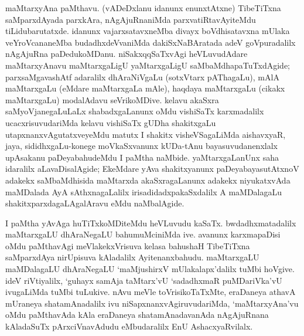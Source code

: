 maMtarxyAna paMthavu. (vADeDxlanu idanunx  enunxtAtxne) Tibe\-TiTxna saMparxdAyada parxkAra, nAgAjuRnaniMda parxvatiRtavAyiteMdu tiLidubarutatxde. idanunx vajarxsatavxneMba divayx boVdhisatavxna mUlaka veYroVcananeMba budadhxdeVvaniMda dakiSxNaBAratada adeV goVpuradalilx nAgAjuRna paDedukoMDanu. niSakxqqSaTxvAgi heVLuvudAdare maMtarxyAnavu maMtarxgaLigU yaMtarxgaLigU saMbaMdhapaTuTxdAgide; parxsaMgavashAtf adaralilx dhAraNiVgaLu (sotxVtarx pAThagaLu), mAlA maMtarxgaLu (eMdare maMtarxgaLa mAle), haqdaya maMtarxgaLu (cikakx maMtarxgaLu) modalAdavu seVrikoMDive. kelavu akaSxra saMyoVjanegaLuLaLx shabadxgaLanunx oMdu vishiSaTx karxmadalilx ucacxrisuvudariMda kelavu vishiSaTx gUDha shakitxgaLu utapxnanxvAgutatxveyeMdu matutx I shakitx visheVSagaLiMda aishavxyaR, jaya, sididhxgaLu-konege moVkaSxvanunx kUDa-tAnu bayasuvudanenxlalx upAsakanu paDeyabahudeMdu I paMtha naMbide. yaMtarxgaLanUnx saha idaralilx aLavaDisalAgide; EkeMdare yAva shakitxyanunx paDeyabayasutAtxnoV adakekx saMbaMdhisida maMtarxda akaSxragaLanunx adakekx niyukatxvAda maMDalada AyA sAthxnagaLalilx irisadidadxpakaSxdalilx A maMDalagaLu shakitxparxdagaLAgalAravu eMdu naMbalAgide.

I paMtha yAvAga huTiTxkoMDiteMdu heVLuvudu kaSaTx. bwdadhxmatadalilx maMtarx\-gaLU dhAraNegaLU bahumuMciniMda ive. avanunx karxmapaDisi oMdu paMthavAgi meVlakekxVrisuva kelasa bahushaH TibeTiTxna saMparxdAya nirUpisuva kAladalilx Ayitenanxbahudu. maMtarxgaLU maMDalagaLU dhAraNegaLU `maMjushirxV mUlakalapx'dalilx tuMbi hoVgive. ideV riVtiyalilx, `guhayx samAja taMtarx'vU `sadadhxmaR puMDariVka'vU ivugaLiMda tuMbi tuLukive. nAvu meVle toVrisikoTaTxMte, eraDaneya athavA mUraneya shatamAnadalilx ivu niSapxnanxvAgiruvudariMda, `maMtarxyAna'vu oMdu paMthavAda kAla eraDaneya shatamAnadavanAda nAgAjuRnana kAladaSuTx pArxciVna\-vAdudu eMbudaralilx EnU AshacxyaRvilalx.

\theendnotes

